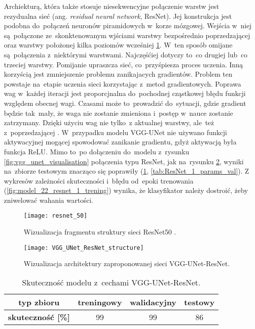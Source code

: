 {\parindent0pt
Archiekturą, która także stosuje niesekwencyjne połączenie warstw jest rezydualna sieć (ang. \textit{residual neural network}, ResNet). Jej konstrukcja jest podobna do~połączeń neuronów piramidowych w~korze mózgowej. Wejścia w~niej są~połączone ze~skonktenowanym wjściami warstwy bezpośrednio poprzedzającej oraz warstwy położonej kilka poziomów wcześniej \ref{fig:resnet_50}. W~ten sposób omijane są~połączenia z~niektórymi warstwami. Najczęśćiej dotyczy to~co drugiej lub~co trzeciej warstwy. Pomijanie upraszcza sieć, co~przyśpiesza proces uczenia. Inną korzyścią jest zmniejszenie problemu zanikajacych gradientów. Problem ten powstaje na~etapie uczenia sieci korzystając z~metod gradientowych. Poprawa wag w~każdej iteracji jest proporcjnalna do~pochodnej cząstkowej błędu funkcji względem obecnej wagi. Czasami może to~prowadzić do~sytuacji, gdzie gradient będzie tak~mały, że waga nie zostanie zmieniona i~postęp w~nauce zostanie zatrzymany. Dzięki użyciu wag nie tylko~z aktualnej warstwy, ale~też z~poprzedzającej \cite{vanishing_gradinets}. W~przypadku modelu VGG-UNet nie używano funkcji aktywacyjnej mogącej spowodować zanikanie gradientu, gdyż aktywacją była funkcja ReLU. Mimo to~po dołączeniu do~modelu z~rysunku \ref{fig:vgg_unet_visualisation}  połączenia typu ResNet, jak na~rysunku \ref{fig:VGG_UNet_ResNet_structure}, wyniki na~zbiorze testowym znacząco się poprawiły (\ref{tab:ResNet_1_acc}, \ref{tab:ResNet_1_params_val}). Z wykresów zależności skuteczności i~błędu od~epoki trenowania (\ref{fig:model_22_resnet_1_trening}) wynika, że klasyfikator należy dostroić, żeby zniwelować wahania wartości.

\begin{figure}[h!]
	\centering
	\centering
		\texttt{[image: resnet\_50]}	
	\caption{Wizualizacja fragmentu struktury sieci ResNet50 \cite{Res_Net_architecture}.}	\label{fig:resnet_50}
\end{figure}

\begin{figure}[h!]
	\centering
	\centering
		\texttt{[image: VGG\_UNet\_ResNet\_structure]}	
	\caption{Wizualizacja architektury zaproponowanej sieci VGG-UNet-ResNet.}	\label{fig:VGG_UNet_ResNet_structure}
\end{figure}

\begin{table}[h!]
\centering
\caption[Short Heading]{Skuteczność modelu z~cechami VGG-UNet-ResNet.}
\label{tab:ResNet_1_acc}
\begin{tabular}{|c|c|c|c|}
\hline
\textbf{typ zbioru}           & \textbf{treningowy} & \textbf{walidacyjny} & \textbf{testowy} \\ \hline
\textbf{skuteczność {[}\%{]}} & 99                  & 99                   & 86               \\ \hline
\end{tabular}
\end{table}

}
